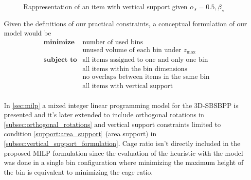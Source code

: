 \begin{figure}[H]
    \scalebox{0.55}{%
    
    }
    \caption{Rappresentation of an item with vertical support given $\alpha_s = 0.5, \beta_s$}
    \label{fig:support}
\end{figure}

\newpage
Given the definitions of our practical constraints, a conceptual formulation of our model would be
\begin{eqnarray*}
    \textbf{minimize} & \text{number of used bins} \\
                        & \text{unused volume of each bin under $z_\text{max}$} \\
    \textbf{subject to} & \text{all items assigned to one and only one bin} \\
                                      & \text{all items within the bin dimensions} \\
                                      & \text{no overlaps between items in the same bin} \\
                                      & \text{all items with vertical support} \\
\end{eqnarray*}

In \cref{sec:milp} a mixed integer linear programming model for the 3D-SBSBPP is presented and it's later extended to include orthogonal rotations in \cref{subsec:orthogonal_rotations} and vertical support constraints limited to condition \ref{support:area_support} (area support) in \cref{subsec:vertical_support_formulation}.
Cage ratio isn't directly included in the proposed MILP formulation since the evaluation of the heuristic with the model was done in a single bin configuration where minimizing the maximum height of the bin is equivalent to minimizing the cage ratio.

